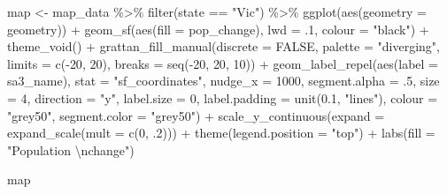 \documentclass[
]{book}
\newenvironment{Shaded}{\begin{snugshade}}{\end{snugshade}}
\newcommand{\AttributeTok}[1]{\textcolor[rgb]{0.77,0.63,0.00}{#1}}
\newcommand{\ConstantTok}[1]{\textcolor[rgb]{0.00,0.00,0.00}{#1}}
\newcommand{\DecValTok}[1]{\textcolor[rgb]{0.00,0.00,0.81}{#1}}
\newcommand{\FloatTok}[1]{\textcolor[rgb]{0.00,0.00,0.81}{#1}}
\newcommand{\FunctionTok}[1]{\textcolor[rgb]{0.00,0.00,0.00}{#1}}
\newcommand{\NormalTok}[1]{#1}
\newcommand{\OtherTok}[1]{\textcolor[rgb]{0.56,0.35,0.01}{#1}}
\newcommand{\SpecialCharTok}[1]{\textcolor[rgb]{0.00,0.00,0.00}{#1}}
\newcommand{\StringTok}[1]{\textcolor[rgb]{0.31,0.60,0.02}{#1}}
\begin{document}
\begin{Shaded}
\begin{Highlighting}[]
\NormalTok{map }\OtherTok{\textless{}{-}}\NormalTok{ map\_data }\SpecialCharTok{\%\textgreater{}\%} 
        \FunctionTok{filter}\NormalTok{(state }\SpecialCharTok{==} \StringTok{"Vic"}\NormalTok{) }\SpecialCharTok{\%\textgreater{}\%} 
        \FunctionTok{ggplot}\NormalTok{(}\FunctionTok{aes}\NormalTok{(}\AttributeTok{geometry =}\NormalTok{ geometry)) }\SpecialCharTok{+}
        \FunctionTok{geom\_sf}\NormalTok{(}\FunctionTok{aes}\NormalTok{(}\AttributeTok{fill =}\NormalTok{ pop\_change),}
                \AttributeTok{lwd =}\NormalTok{ .}\DecValTok{1}\NormalTok{,}
                \AttributeTok{colour =} \StringTok{"black"}\NormalTok{) }\SpecialCharTok{+}
        \FunctionTok{theme\_void}\NormalTok{() }\SpecialCharTok{+}
        \FunctionTok{grattan\_fill\_manual}\NormalTok{(}\AttributeTok{discrete =} \ConstantTok{FALSE}\NormalTok{, }
                            \AttributeTok{palette =} \StringTok{"diverging"}\NormalTok{,}
                            \AttributeTok{limits =} \FunctionTok{c}\NormalTok{(}\SpecialCharTok{{-}}\DecValTok{20}\NormalTok{, }\DecValTok{20}\NormalTok{),}
                            \AttributeTok{breaks =} \FunctionTok{seq}\NormalTok{(}\SpecialCharTok{{-}}\DecValTok{20}\NormalTok{, }\DecValTok{20}\NormalTok{, }\DecValTok{10}\NormalTok{)) }\SpecialCharTok{+}
  \FunctionTok{geom\_label\_repel}\NormalTok{(}\FunctionTok{aes}\NormalTok{(}\AttributeTok{label =}\NormalTok{ sa3\_name),}
                  \AttributeTok{stat =} \StringTok{"sf\_coordinates"}\NormalTok{, }\AttributeTok{nudge\_x =} \DecValTok{1000}\NormalTok{, }\AttributeTok{segment.alpha =}\NormalTok{ .}\DecValTok{5}\NormalTok{,}
                  \AttributeTok{size =} \DecValTok{4}\NormalTok{, }
                  \AttributeTok{direction =} \StringTok{"y"}\NormalTok{,}
                  \AttributeTok{label.size =} \DecValTok{0}\NormalTok{, }
                  \AttributeTok{label.padding =} \FunctionTok{unit}\NormalTok{(}\FloatTok{0.1}\NormalTok{, }\StringTok{"lines"}\NormalTok{),}
                  \AttributeTok{colour =} \StringTok{"grey50"}\NormalTok{,}
                  \AttributeTok{segment.color =} \StringTok{"grey50"}\NormalTok{) }\SpecialCharTok{+} 
  \FunctionTok{scale\_y\_continuous}\NormalTok{(}\AttributeTok{expand =} \FunctionTok{expand\_scale}\NormalTok{(}\AttributeTok{mult =} \FunctionTok{c}\NormalTok{(}\DecValTok{0}\NormalTok{, .}\DecValTok{2}\NormalTok{))) }\SpecialCharTok{+} 
  \FunctionTok{theme}\NormalTok{(}\AttributeTok{legend.position =} \StringTok{"top"}\NormalTok{) }\SpecialCharTok{+} 
  \FunctionTok{labs}\NormalTok{(}\AttributeTok{fill =} \StringTok{"Population }\SpecialCharTok{\textbackslash{}n}\StringTok{change"}\NormalTok{)}

\NormalTok{map}
\end{Highlighting}
\end{Shaded}
\end{document}
